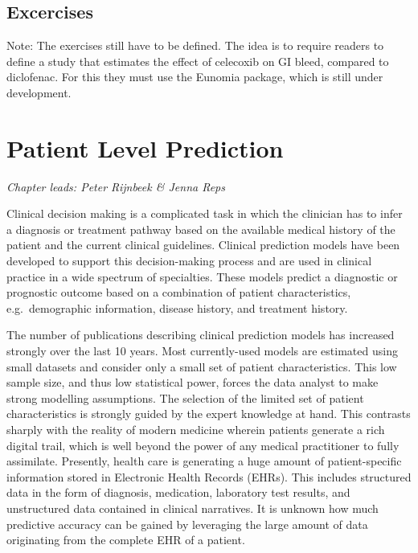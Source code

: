 \documentclass[11pt]{book}
\theoremstyle{definition}
\theoremstyle{definition}
\theoremstyle{definition}
\theoremstyle{remark}
\begin{document}
\hypertarget{excercises}{%
\section{Excercises}\label{excercises}}

Note: The exercises still have to be defined. The idea is to require readers to define a study that estimates the effect of celecoxib on GI bleed, compared to diclofenac. For this they must use the Eunomia package, which is still under development.

\hypertarget{PatientLevelPrediction}{%
\chapter{Patient Level Prediction}\label{PatientLevelPrediction}}

\emph{Chapter leads: Peter Rijnbeek \& Jenna Reps}


Clinical decision making is a complicated task in which the clinician has to infer a diagnosis or treatment pathway based on the available medical history of the patient and the current clinical guidelines. Clinical prediction models have been developed to support this decision-making process and are used in clinical practice in a wide spectrum of specialties. These models predict a diagnostic or prognostic outcome based on a combination of patient characteristics, e.g.~demographic information, disease history, and treatment history.   

The number of publications describing clinical prediction models has increased strongly over the last 10 years. Most currently-used models are estimated using small datasets and consider only a small set of patient characteristics. This low sample size, and thus low statistical power, forces the data analyst to make strong modelling assumptions. The selection of the limited set of patient characteristics is strongly guided by the expert knowledge at hand. This contrasts sharply with the reality of modern medicine wherein patients generate a rich digital trail, which is well beyond the power of any medical practitioner to fully assimilate. Presently, health care is generating a huge amount of patient-specific information stored in Electronic Health Records (EHRs). This includes structured data in the form of diagnosis, medication, laboratory test results, and unstructured data contained in clinical narratives. It is unknown how much predictive accuracy can be gained by leveraging the large amount of data originating from the complete EHR of a patient. 
\end{document}
